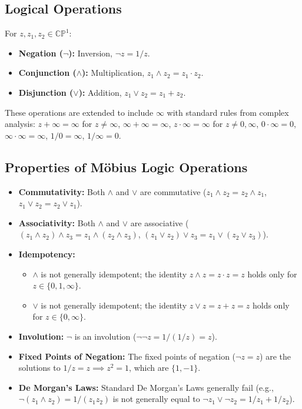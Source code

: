 	\subsection{Logical Operations}
	For $z, z_1, z_2 \in \mathbb{CP}^1$:
	\begin{itemize}
		\item \textbf{Negation ($\neg$):} Inversion, $\neg z = 1/z$.
		\item \textbf{Conjunction ($\wedge$):} Multiplication, $z_1 \wedge z_2 = z_1 \cdot z_2$.
		\item \textbf{Disjunction ($\vee$):} Addition, $z_1 \vee z_2 = z_1 + z_2$.
	\end{itemize}
	These operations are extended to include $\infty$ with standard rules from complex analysis: $z+\infty = \infty$ for $z \neq \infty$, $\infty+\infty=\infty$, $z \cdot \infty = \infty$ for $z \neq 0, \infty$, $0 \cdot \infty = 0$, $\infty \cdot \infty = \infty$, $1/0 = \infty$, $1/\infty = 0$.
	
	\subsection{Properties of Möbius Logic Operations}
	\begin{itemize}
		\item \textbf{Commutativity:} Both \(\wedge\) and \(\vee\) are commutative (\(z_1 \wedge z_2 = z_2 \wedge z_1\), \(z_1 \vee z_2 = z_2 \vee z_1\)).
		\item \textbf{Associativity:} Both \(\wedge\) and \(\vee\) are associative (\((z_1 \wedge z_2) \wedge z_3 = z_1 \wedge (z_2 \wedge z_3)\), \((z_1 \vee z_2) \vee z_3 = z_1 \vee (z_2 \vee z_3)\)).
		\item \textbf{Idempotency:}
		\begin{itemize}
			\item \(\wedge\) is not generally idempotent; the identity \(z \wedge z = z \cdot z = z\) holds only for \(z \in \{0, 1, \infty\}\).
			\item \(\vee\) is not generally idempotent; the identity \(z \vee z = z + z = z\) holds only for \(z \in \{0, \infty\}\).
		\end{itemize}
		\item \textbf{Involution:} \(\neg\) is an involution (\(\neg \neg z = 1/(1/z) = z\)).
		\item \textbf{Fixed Points of Negation:} The fixed points of negation (\(\neg z = z\)) are the solutions to \(1/z = z \implies z^2 = 1\), which are \(\{1, -1\}\).
		\item \textbf{De Morgan's Laws:} Standard De Morgan's Laws generally fail (e.g., \(\neg(z_1 \wedge z_2) = 1/(z_1 z_2)\) is not generally equal to \(\neg z_1 \vee \neg z_2 = 1/z_1 + 1/z_2\)).
	\end{itemize}
	
